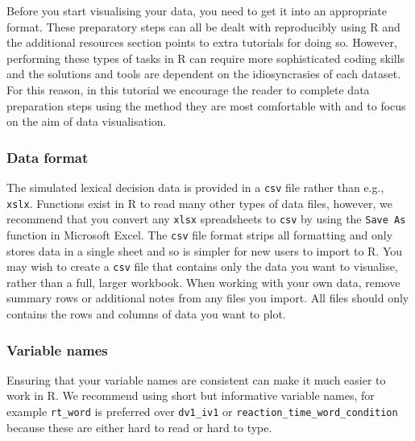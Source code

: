 \documentclass[
  english,
  doc,floatsintext]{apa6}
\begin{document}
Before you start visualising your data, you need to get it into an appropriate format. These preparatory steps can all be dealt with reproducibly using R and the additional resources section points to extra tutorials for doing so. However, performing these types of tasks in R can require more sophisticated coding skills and the solutions and tools are dependent on the idiosyncrasies of each dataset. For this reason, in this tutorial we encourage the reader to complete data preparation steps using the method they are most comfortable with and to focus on the aim of data visualisation.

\hypertarget{data-format}{%
\subsubsection{Data format}\label{data-format}}

The simulated lexical decision data is provided in a \texttt{csv} file rather than e.g., \texttt{xslx}. Functions exist in R to read many other types of data files, however, we recommend that you convert any \texttt{xlsx} spreadsheets to \texttt{csv} by using the \texttt{Save\ As} function in Microsoft Excel. The \texttt{csv} file format strips all formatting and only stores data in a single sheet and so is simpler for new users to import to R. You may wish to create a \texttt{csv} file that contains only the data you want to visualise, rather than a full, larger workbook. When working with your own data, remove summary rows or additional notes from any files you import. All files should only contains the rows and columns of data you want to plot.

\hypertarget{variable-names}{%
\subsubsection{Variable names}\label{variable-names}}

Ensuring that your variable names are consistent can make it much easier to work in R. We recommend using short but informative variable names, for example \texttt{rt\_word} is preferred over \texttt{dv1\_iv1} or \texttt{reaction\_time\_word\_condition} because these are either hard to read or hard to type.
\end{document}
